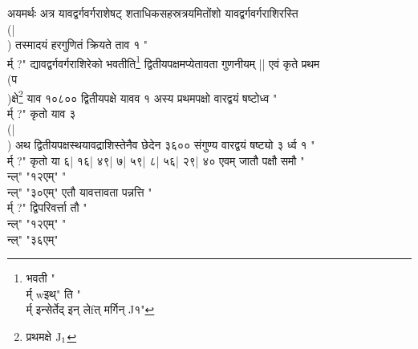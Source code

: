\documentclass[12pt]{article}
\begin{document}
{अयमर्थः %
अत्र यावद्वर्गवर्गराशेषट् शताधिकसहस्रत्रयमितोंशो
यावद्वर्गवर्गराशिरस्ति\\(|\\)
तस्मादयं हरगुणितं क्रियते ताव १ "{\\र्म् ?}" द्यावद्वर्गवर्गराशिरेको
भवतीति\footnote{{\s भवती }"{\\र्म् wइथ्}" ति "{\\र्म् इन्सेर्तेद् इन् लेfत् मर्गिन् J१}"}
द्वितीयपक्षमप्येतावता गुणनीयम् ||
एवं कृते
प्रथम\\(प\\)क्षे\footnote{{\s प्रथमक्षे }${\rm J_1}$}
याव १०८०० द्वितीयपक्षे यावव १ अस्य प्रथमपक्षो
वारद्वयं षष्टोध्व "{\\र्म् ?}" कृतो याव ३\\(|\\)
अथ द्वितीयपक्षस्थयावद्राशिस्तेनैव छेदेन ३६०० 
संगुण्य वारद्वयं षष्ट्यो ३ र्ध्व १ "{\\र्म् ?}" कृतो
या ६| १६| ४९| ७| ५९| ८| ५६| २९| ४०
एवम् जातौ पक्षौ समौ
"\\न्ल्"
"{१२एम्}"
"\\न्ल्"
"{३०एम्}"
एतौ यावत्तावता पन्नत्ति "{\\र्म् ?}" द्विपरिवर्त्ता तौ
"\\न्ल्"
"{१२एम्}"
"\\न्ल्"
"{३६एम्}"

}
\end{document}
